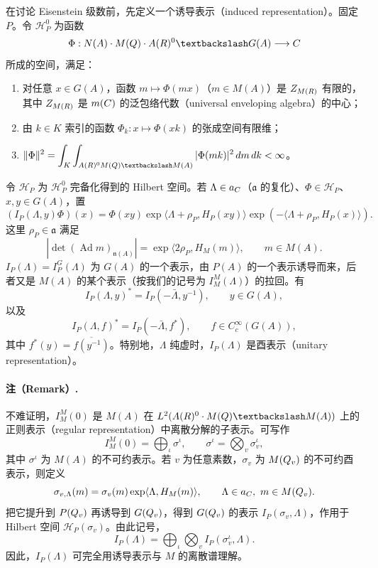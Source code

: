 在讨论 Eisenstein 级数前，先定义一个诱导表示（induced representation）。固定 $P$。令 $\mathcal H_P^0$ 为函数
\[
 \Phi:N(A)\cdot M(\Q)\cdot A(\R)^0\backslash G(A)\longrightarrow\C
\]
所成的空间，满足：
\begin{enumerate}
\item[(i)] 对任意 $x\in G(A)$，函数 $m\mapsto\Phi(mx)$（$m\in M(A)$）是 $Z_{M(R)}$ 有限的，其中 $Z_{M(R)}$ 是 $m(C)$ 的泛包络代数（universal enveloping algebra）的中心；
\item[(ii)] 由 $k\in K$ 索引的函数 $\Phi_k:x\mapsto\Phi(xk)$ 的张成空间有限维；
\item[(iii)] $\displaystyle\|\Phi\|^2=\int_K\int_{A(\R)^0M(\Q)\backslash M(A)}|\Phi(mk)|^2\,dm\,dk<\infty$。
\end{enumerate}
令 $\mathcal H_P$ 为 $\mathcal H_P^0$ 完备化得到的 Hilbert 空间。若 $\Lambda\in a_C$（$\mathfrak a$ 的复化）、$\Phi\in\mathcal H_P$、$x,y\in G(A)$，置
\[
 (I_P(\Lambda,y)\Phi)(x)=\Phi(xy)
 \exp\langle\Lambda+\rho_P,H_P(xy)\rangle
 \exp(-\langle\Lambda+\rho_P,H_P(x)\rangle).
\]
这里 $\rho_P\in\mathfrak a$ 满足
\[
 |\det(\operatorname{Ad}m)_{\mathfrak n(A)}|
 =\exp\langle2\rho_P,H_M(m)\rangle,\qquad m\in M(A).
\]
$I_P(\Lambda)=I_P^G(\Lambda)$ 为 $G(A)$ 的一个表示，由 $P(A)$ 的一个表示诱导而来，后者又是 $M(A)$ 的某个表示（按我们的记号为 $I_M^M(\Lambda)$）的拉回。有
\[
 I_P(\Lambda,y)^*=I_P(-\bar\Lambda,y^{-1}),\qquad y\in G(A),
\]
以及
\[
 I_P(\Lambda,f)^*=I_P(-\bar\Lambda,f^*),\qquad f\in C_c^\infty(G(A)),
\]
其中 $f^*(y)=\overline{f(y^{-1})}$。特别地，$\Lambda$ 纯虚时，$I_P(\Lambda)$ 是酉表示（unitary representation）。

\paragraph*{注（Remark）.}
不难证明，$I_M^M(0)$ 是 $M(A)$ 在 $L^2(A(\R)^0\cdot M(\Q)\backslash M(A))$ 上的正则表示（regular representation）中离散分解的子表示。可写作
\[
 I_M^M(0)=\bigoplus_\iota\sigma^\iota,\qquad\sigma^\iota=\bigotimes_v\sigma_v^\iota,
\]
其中 $\sigma^\iota$ 为 $M(A)$ 的不可约表示。若 $v$ 为任意素数，$\sigma_v$ 为 $M(Q_v)$ 的不可约酉表示，则定义
\[
 \sigma_{v,\Lambda}(m)=\sigma_v(m)\exp\langle\Lambda,H_M(m)\rangle,
 \qquad\Lambda\in a_C,\ m\in M(Q_v).
\]
把它提升到 $P(Q_v)$ 再诱导到 $G(Q_v)$，得到 $G(Q_v)$ 的表示 $I_P(\sigma_v,\Lambda)$，作用于 Hilbert 空间 $\mathcal H_P(\sigma_v)$。由此记号，
\[
 I_P(\Lambda)=\bigoplus_\iota\bigotimes_vI_P(\sigma_v^\iota,\Lambda).
\]
因此，$I_P(\Lambda)$ 可完全用诱导表示与 $M$ 的离散谱理解。

